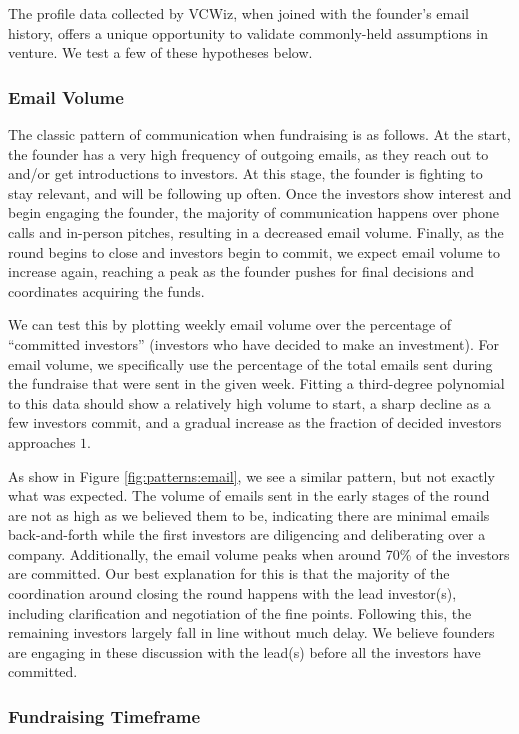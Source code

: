 The profile data collected by VCWiz, when joined with the founder's email history, offers a unique opportunity to validate commonly-held assumptions in venture. We test a few of these hypotheses below.

\subsubsection{Email Volume}

The classic pattern of communication when fundraising is as follows. At the start, the founder has a very high frequency of outgoing emails, as they reach out to and/or get introductions to investors. At this stage, the founder is fighting to stay relevant, and will be following up often. Once the investors show interest and begin engaging the founder, the majority of communication happens over phone calls and in-person pitches, resulting in a decreased email volume. Finally, as the round begins to close and investors begin to commit, we expect email volume to increase again, reaching a peak as the founder pushes for final decisions and coordinates acquiring the funds.

We can test this by plotting weekly email volume over the percentage of ``committed investors'' (investors who have decided to make an investment). For email volume, we specifically use the percentage of the total emails sent during the fundraise that were sent in the given week. Fitting a third-degree polynomial to this data should show a relatively high volume to start, a sharp decline as a few investors commit, and a gradual increase as the fraction of decided investors approaches $1$.

As show in Figure \ref{fig:patterns:email}, we see a similar pattern, but not exactly what was expected. The volume of emails sent in the early stages of the round are not as high as we believed them to be, indicating there are minimal emails back-and-forth while the first investors are diligencing and deliberating over a company. Additionally, the email volume peaks when around 70\% of the investors are committed. Our best explanation for this is that the majority of the coordination around closing the round happens with the lead investor(s), including clarification and negotiation of the fine points. Following this, the remaining investors largely fall in line without much delay. We believe founders are engaging in these discussion with the lead(s) before all the investors have committed.

\subsubsection{Fundraising Timeframe}

